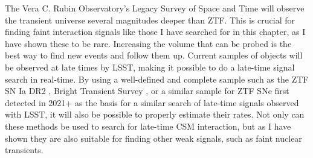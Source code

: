 \documentclass[a4paper,oneside,12pt, class=Latex/Classes/PhDthesisPSnPDF, crop=false]{standalone}
\begin{document}
The Vera C. Rubin Observatory's Legacy Survey of Space and Time \cite[LSST;][]{LSST} will observe the transient universe several magnitudes deeper than ZTF. This is crucial for finding faint interaction signals like those I have searched for in this chapter, as I have shown these to be rare. Increasing the volume that can be probed is the best way to find new events and follow them up. Current samples of objects will be observed at late times by LSST, making it possible to do a late-time signal search in real-time. By using a well-defined and complete sample such as the ZTF SN Ia DR2 \citep[][, Smith et al.,~in prep.]{DR2_Overview}, Bright Transient Survey \cite[BTS;][]{BTS_I, BTS_II}, or a similar sample for ZTF SNe first detected in 2021+ as the basis for a similar search of late-time signals observed with LSST, it will also be possible to properly estimate their rates. Not only can these methods be used to search for late-time CSM interaction, but as I have shown they are also suitable for finding other weak signals, such as faint nuclear transients.
\end{document}

